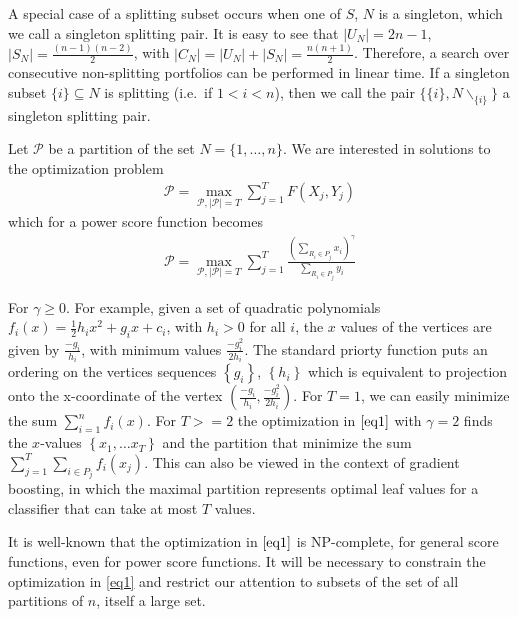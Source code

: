 \documentclass{article}
\theoremstyle{case}
\begin{document}
A special case of a splitting subset occurs when one of $S$, $N$ is a singleton, which we call a singleton splitting pair. It is easy to see that $| U_N | = 2n - 1$, $| S_N | = \frac{(n-1)(n-2)}{2}$, with $|C_N| = |U_N| + |S_N| = \frac{n(n+1)}{2}$. Therefore, a search over consecutive non-splitting portfolios can be performed in linear time. If a singleton subset $\{ i \} \subseteq N$ is splitting (i.e.\ if $1 < i < n$), then we call the pair $\{ \{i\}, N\backslash_{\{i\}} \}$ a singleton splitting pair.


Let $\mathcal{P}$ be a partition of the set $N = \{1, \dots, n\}$. We are interested in solutions to the optimization problem
\begin{align} \label{eq0}
\mathcal{P} = \max_{\mathcal{P}, \vert \mathcal{P} \vert = T} {\sum\limits_{j=1}^{T}F\left( X_j, Y_j\right)}
\end{align}
which for a power score function becomes
\begin{align} \label{eq1}
\mathcal{P} = \max_{\mathcal{P}, \vert \mathcal{P} \vert = T}\sum_{j=1}^{T}\frac{(\sum_{R_i \in P_j}x_i)^\gamma}{\sum_{R_i \in P_j}y_i}
\end{align}

For $\gamma \geq 0$. For example, given a set of quadratic polynomials $f_i(x) = \frac{1}{2}h_ix^2 + g_ix + c_i$, with $h_i >0$ for all $i$, the $x$ values of the vertices are given by $\frac{-g_i}{h_i}$, with minimum values $\frac{-g_i^2}{2h_i}$. The standard priorty function puts an ordering on the vertices sequences $\left\lbrace g_i\right\rbrace$, $\left\lbrace h_i  \right\rbrace$ which is equivalent to projection onto the x-coordinate of the vertex $\left(\frac{-g_i}{h_i},\frac{-g_i^2}{2h_i}\right)$. For $T = 1$, we can easily minimize the sum $\sum_{i=1}^{n} f_i(x)$. For $T >= 2$ the optimization in $\ref{eq1}$ with $\gamma = 2$ finds the $x$-values $\left\lbrace x_1, \dots x_T\right\rbrace$ and the partition that minimize the sum $\sum_{j=1}^T \sum_{i \in P_j} f_i\left( x_j\right)$. This can also be viewed in the context of gradient boosting, in which the maximal partition represents optimal leaf values for a classifier that can take at most $T$ values.

It is well-known that the optimization in $\ref{eq1}$ is NP-complete, for general score functions, even for power score functions. It will be necessary to constrain the optimization in \ref{eq1} and restrict our attention to subsets of the set of all partitions of $n$, itself a large set.
\end{document}
